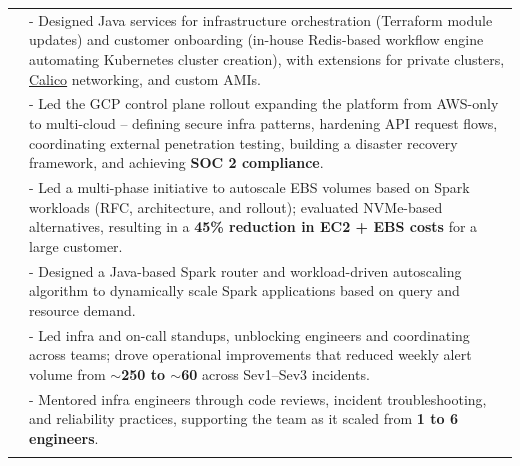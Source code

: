 \documentclass[a4paper,10pt]{extarticle}
\begin{document}
\begin{tabularx}{\linewidth}{ l | X }
& \small{- Designed Java services for infrastructure orchestration (Terraform module updates) and customer onboarding (in-house Redis-based workflow engine automating Kubernetes cluster creation), with extensions for private clusters, \href{https://www.tigera.io/project-calico/}{Calico} networking, and custom AMIs.}\\
& \small{- Led the GCP control plane rollout expanding the platform from AWS-only to multi-cloud -- defining secure infra patterns, hardening API request flows, coordinating external penetration testing, building a disaster recovery framework, and achieving \textbf{SOC 2 compliance}.}\\
& \small{- Led a multi-phase initiative to autoscale EBS volumes based on Spark workloads (RFC, architecture, and rollout); evaluated NVMe-based alternatives, resulting in a \textbf{45\% reduction in EC2 + EBS costs} for a large customer.}\\
& \small{- Designed a Java-based Spark router and workload-driven autoscaling algorithm to dynamically scale Spark applications based on query and resource demand.}\\
& \small{- Led infra and on-call standups, unblocking engineers and coordinating across teams; drove operational improvements that reduced weekly alert volume from \textbf{$\sim$250 to $\sim$60} across Sev1--Sev3 incidents.}\\
& \small{- Mentored infra engineers through code reviews, incident troubleshooting, and reliability practices, supporting the team as it scaled from \textbf{1 to 6 engineers}.}\\
\multicolumn{2}{c}{}\\




\end{tabularx}
\end{document}
